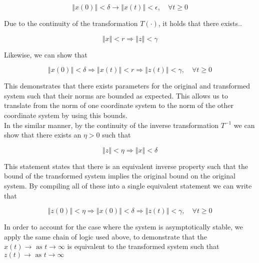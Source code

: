 $$
\left\Vert x(0) \right\Vert < \delta \rightarrow \left\Vert x(t) \right\Vert < \epsilon, \quad \forall t \geq 0
$$

\noindent Due to the continuity of the transformation $T(\cdot)$, it holds that there exists..

$$
\left\Vert x \right\Vert < r \Rightarrow \left\Vert z \right\Vert < \gamma
$$

\noindent Likewise, we can show that

$$
\left\Vert x(0) \right\Vert < \delta \Rightarrow \left\Vert x(t) \right\Vert < r \Rightarrow \left\Vert z(t) \right\Vert < \gamma  , \quad \forall t \geq 0
$$

\noindent This demonstrates that there exists parameters for the original and transformed system such that their norms are bounded as expected. This allows us to translate from the norm of one coordinate system to the norm of the other coordinate system by using this bounds. \\


\noindent In the similar manner, by the continuity of the inverse transformation $T^{-1}$ we can show that there exists an $\eta >0$ such that

$$
\left\Vert z \right\Vert < \eta \Rightarrow \left\Vert x \right\Vert < \delta
$$

\noindent This statement states that there is an equivalent inverse property such that the bound of the transformed system implies the original bound on the original system. By compiling all of these into a single equivalent statement we can write that

$$
\left\Vert z(0) \right\Vert < \eta \Rightarrow \left\Vert x(0) \right\Vert < \delta \Rightarrow \left\Vert z(t) \right\Vert < \gamma  , \quad \forall t \geq 0
$$

\noindent In order to account for the case where the system is asymptotically stable, we apply the same chain of logic used above, to demonstrate that the $x(t) \rightarrow \text{ as } t \rightarrow \infty$ is equivalent to the transformed system such that $z(t) \rightarrow \text{ as } t \rightarrow \infty$
